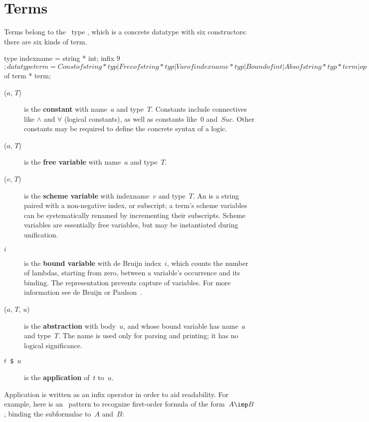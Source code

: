 \section{Terms}
Terms belong to the \ML\ type , which is a concrete datatype
with six constructors: there are six kinds of term.
\begin{ttbox}
type indexname = string * int;
infix 9 $;
datatype term = Const of string * typ
              | Free  of string * typ
              | Var   of indexname * typ
              | Bound of int
              | Abs   of string * typ * term
              | op $  of term * term;
\end{ttbox}
\begin{description}
\item[($a$, $T$)] 
is the {\bf constant} with name~$a$ and type~$T$.  Constants include
connectives like $\land$ and $\forall$ (logical constants), as well as
constants like~0 and~$Suc$.  Other constants may be required to define the
concrete syntax of a logic.

\item[($a$, $T$)] 
is the {\bf free variable} with name~$a$ and type~$T$.

\item[($v$, $T$)] 
is the {\bf scheme variable} with indexname~$v$ and type~$T$.  An
 is a string paired with a non-negative index, or
subscript; a term's scheme variables can be systematically renamed by
incrementing their subscripts.  Scheme variables are essentially free
variables, but may be instantiated during unification.

\item[ $i$] 
is the {\bf bound variable} with de Bruijn index~$i$, which counts the
number of lambdas, starting from zero, between a variable's occurrence and
its binding.  The representation prevents capture of variables.  For more
information see de Bruijn \cite{debruijn72} or
Paulson~\cite[page~336]{paulson91}.

\item[($a$, $T$, $u$)] 
is the {\bf abstraction} with body~$u$, and whose bound variable has
name~$a$ and type~$T$.  The name is used only for parsing and printing; it
has no logical significance.

\item[\tt $t$ \$ $u$] 
is the {\bf application} of~$t$ to~$u$.  
\end{description}
Application is written as an infix operator in order to aid readability.
For example, here is an \ML\ pattern to recognize first-order formula of
the form~$A\imp B$, binding the subformulae to~$A$ and~$B$:


